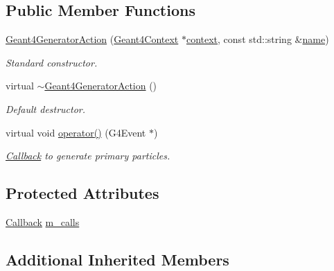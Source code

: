 \subsection*{Public Member Functions}
\begin{DoxyCompactItemize}
\item 
\hyperlink{class_d_d4hep_1_1_simulation_1_1_geant4_generator_action_aa172a80d58e0f0c1d62bad456233fcf0}{Geant4\+Generator\+Action} (\hyperlink{class_d_d4hep_1_1_simulation_1_1_geant4_context}{Geant4\+Context} $\ast$\hyperlink{class_d_d4hep_1_1_simulation_1_1_geant4_action_aa9d87f0ec2a72b7fc2591b18f98d75cf}{context}, const std\+::string \&\hyperlink{class_d_d4hep_1_1_simulation_1_1_geant4_action_af374e70b014d16afb81dd9d77cc3894b}{name})
\begin{DoxyCompactList}\small\item\em Standard constructor. \end{DoxyCompactList}\item 
virtual \hyperlink{class_d_d4hep_1_1_simulation_1_1_geant4_generator_action_a4b70fe9a48775ddf6853ff699606430d}{$\sim$\+Geant4\+Generator\+Action} ()
\begin{DoxyCompactList}\small\item\em Default destructor. \end{DoxyCompactList}\item 
virtual void \hyperlink{class_d_d4hep_1_1_simulation_1_1_geant4_generator_action_ac5a1d2335a19e3f9d555081199e01801}{operator()} (G4\+Event $\ast$)
\begin{DoxyCompactList}\small\item\em \hyperlink{class_d_d4hep_1_1_callback}{Callback} to generate primary particles. \end{DoxyCompactList}\end{DoxyCompactItemize}
\subsection*{Protected Attributes}
\begin{DoxyCompactItemize}
\item 
\hyperlink{class_d_d4hep_1_1_callback}{Callback} \hyperlink{class_d_d4hep_1_1_simulation_1_1_geant4_generator_action_aa0b8787cbdd5dfefc992aac6dd1073c3}{m\+\_\+calls}
\end{DoxyCompactItemize}
\subsection*{Additional Inherited Members}


